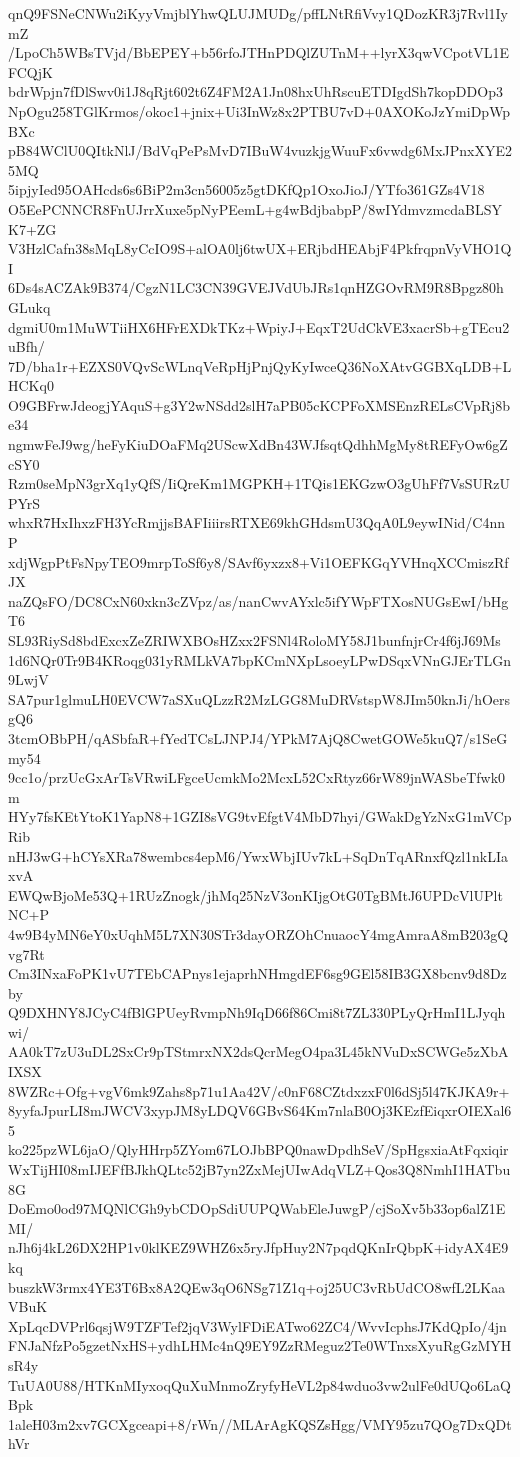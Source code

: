 qnQ9FSNeCNWu2iKyyVmjblYhwQLUJMUDg/pffLNtRfiVvy1QDozKR3j7Rvl1IymZ
/LpoCh5WBsTVjd/BbEPEY+b56rfoJTHnPDQlZUTnM++lyrX3qwVCpotVL1EFCQjK
bdrWpjn7fDlSwv0i1J8qRjt602t6Z4FM2A1Jn08hxUhRscuETDIgdSh7kopDDOp3
NpOgu258TGlKrmos/okoc1+jnix+Ui3InWz8x2PTBU7vD+0AXOKoJzYmiDpWpBXc
pB84WClU0QItkNlJ/BdVqPePsMvD7IBuW4vuzkjgWuuFx6vwdg6MxJPnxXYE25MQ
5ipjyIed95OAHcds6s6BiP2m3cn56005z5gtDKfQp1OxoJioJ/YTfo361GZs4V18
O5EePCNNCR8FnUJrrXuxe5pNyPEemL+g4wBdjbabpP/8wIYdmvzmcdaBLSYK7+ZG
V3HzlCafn38sMqL8yCcIO9S+alOA0lj6twUX+ERjbdHEAbjF4PkfrqpnVyVHO1QI
6Ds4sACZAk9B374/CgzN1LC3CN39GVEJVdUbJRs1qnHZGOvRM9R8Bpgz80hGLukq
dgmiU0m1MuWTiiHX6HFrEXDkTKz+WpiyJ+EqxT2UdCkVE3xacrSb+gTEcu2uBfh/
7D/bha1r+EZXS0VQvScWLnqVeRpHjPnjQyKyIwceQ36NoXAtvGGBXqLDB+LHCKq0
O9GBFrwJdeogjYAquS+g3Y2wNSdd2slH7aPB05cKCPFoXMSEnzRELsCVpRj8be34
ngmwFeJ9wg/heFyKiuDOaFMq2UScwXdBn43WJfsqtQdhhMgMy8tREFyOw6gZcSY0
Rzm0seMpN3grXq1yQfS/IiQreKm1MGPKH+1TQis1EKGzwO3gUhFf7VsSURzUPYrS
whxR7HxIhxzFH3YcRmjjsBAFIiiirsRTXE69khGHdsmU3QqA0L9eywINid/C4nnP
xdjWgpPtFsNpyTEO9mrpToSf6y8/SAvf6yxzx8+Vi1OEFKGqYVHnqXCCmiszRfJX
naZQsFO/DC8CxN60xkn3cZVpz/as/nanCwvAYxlc5ifYWpFTXosNUGsEwI/bHgT6
SL93RiySd8bdExcxZeZRIWXBOsHZxx2FSNl4RoloMY58J1bunfnjrCr4f6jJ69Ms
1d6NQr0Tr9B4KRoqg031yRMLkVA7bpKCmNXpLsoeyLPwDSqxVNnGJErTLGn9LwjV
SA7pur1glmuLH0EVCW7aSXuQLzzR2MzLGG8MuDRVstspW8JIm50knJi/hOersgQ6
3tcmOBbPH/qASbfaR+fYedTCsLJNPJ4/YPkM7AjQ8CwetGOWe5kuQ7/s1SeGmy54
9cc1o/przUcGxArTsVRwiLFgceUcmkMo2McxL52CxRtyz66rW89jnWASbeTfwk0m
HYy7fsKEtYtoK1YapN8+1GZI8sVG9tvEfgtV4MbD7hyi/GWakDgYzNxG1mVCpRib
nHJ3wG+hCYsXRa78wembcs4epM6/YwxWbjIUv7kL+SqDnTqARnxfQzl1nkLIaxvA
EWQwBjoMe53Q+1RUzZnogk/jhMq25NzV3onKIjgOtG0TgBMtJ6UPDcVlUPltNC+P
4w9B4yMN6eY0xUqhM5L7XN30STr3dayORZOhCnuaocY4mgAmraA8mB203gQvg7Rt
Cm3INxaFoPK1vU7TEbCAPnys1ejaprhNHmgdEF6sg9GEl58IB3GX8bcnv9d8Dzby
Q9DXHNY8JCyC4fBlGPUeyRvmpNh9IqD66f86Cmi8t7ZL330PLyQrHmI1LJyqhwi/
AA0kT7zU3uDL2SxCr9pTStmrxNX2dsQcrMegO4pa3L45kNVuDxSCWGe5zXbAIXSX
8WZRc+Ofg+vgV6mk9Zahs8p71u1Aa42V/c0nF68CZtdxzxF0l6dSj5l47KJKA9r+
8yyfaJpurLI8mJWCV3xypJM8yLDQV6GBvS64Km7nlaB0Oj3KEzfEiqxrOIEXal65
ko225pzWL6jaO/QlyHHrp5ZYom67LOJbBPQ0nawDpdhSeV/SpHgsxiaAtFqxiqir
WxTijHI08mIJEFfBJkhQLtc52jB7yn2ZxMejUIwAdqVLZ+Qos3Q8NmhI1HATbu8G
DoEmo0od97MQNlCGh9ybCDOpSdiUUPQWabEleJuwgP/cjSoXv5b33op6alZ1EMI/
nJh6j4kL26DX2HP1v0klKEZ9WHZ6x5ryJfpHuy2N7pqdQKnIrQbpK+idyAX4E9kq
buszkW3rmx4YE3T6Bx8A2QEw3qO6NSg71Z1q+oj25UC3vRbUdCO8wfL2LKaaVBuK
XpLqcDVPrl6qsjW9TZFTef2jqV3WylFDiEATwo62ZC4/WvvIcphsJ7KdQpIo/4jn
FNJaNfzPo5gzetNxHS+ydhLHMc4nQ9EY9ZzRMeguz2Te0WTnxsXyuRgGzMYHsR4y
TuUA0U88/HTKnMIyxoqQuXuMnmoZryfyHeVL2p84wduo3vw2ulFe0dUQo6LaQBpk
1aleH03m2xv7GCXgceapi+8/rWn//MLArAgKQSZsHgg/VMY95zu7QOg7DxQDthVr
